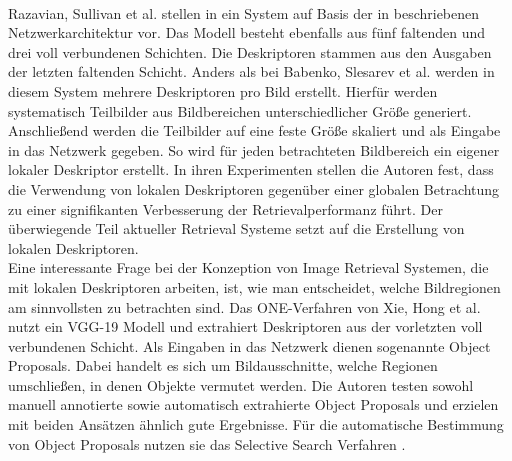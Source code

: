 \\
Razavian, Sullivan et al. stellen in \cite{convnet} ein System auf Basis der in \cite{convnetarc} beschriebenen Netzwerkarchitektur vor. Das Modell besteht ebenfalls aus fünf faltenden und drei voll verbundenen Schichten. Die Deskriptoren stammen aus den Ausgaben der letzten faltenden Schicht.
Anders als bei Babenko, Slesarev et al. werden in diesem System mehrere Deskriptoren pro Bild erstellt. Hierfür werden systematisch Teilbilder aus Bildbereichen unterschiedlicher Größe generiert. Anschließend werden die Teilbilder auf eine feste Größe skaliert und als Eingabe in das Netzwerk gegeben. So wird für jeden betrachteten Bildbereich ein eigener lokaler Deskriptor erstellt. In ihren Experimenten stellen die Autoren fest, dass die Verwendung von lokalen Deskriptoren gegenüber einer globalen Betrachtung zu einer signifikanten Verbesserung der Retrievalperformanz führt. Der überwiegende Teil aktueller Retrieval Systeme setzt auf die Erstellung von lokalen Deskriptoren.
\\
Eine interessante Frage bei der Konzeption von Image Retrieval Systemen, die mit lokalen Deskriptoren arbeiten, ist, wie man entscheidet, welche Bildregionen am sinnvollsten zu betrachten sind. Das ONE-Verfahren \cite{one} von Xie, Hong et al. nutzt ein VGG-19 \cite{vgg} Modell und extrahiert Deskriptoren aus der vorletzten voll verbundenen Schicht. Als Eingaben in das Netzwerk dienen sogenannte Object Proposals. Dabei handelt es sich um Bildausschnitte, welche Regionen umschließen, in denen Objekte vermutet werden. Die Autoren testen sowohl manuell annotierte sowie automatisch extrahierte Object Proposals und erzielen mit beiden Ansätzen ähnlich gute Ergebnisse. Für die automatische Bestimmung von Object Proposals nutzen sie das Selective Search Verfahren \cite{selective_search}.
\\
